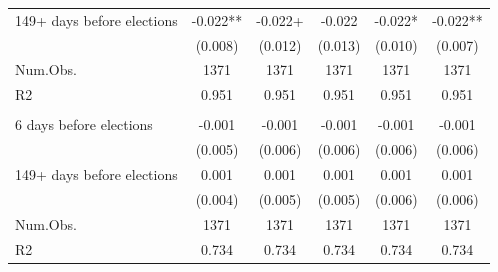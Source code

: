 \begin{tabular}[t]{lccccc}
\hspace{1em}149+ days before elections & -0.022** & -0.022+ & -0.022 & -0.022* & -0.022**\\
\hspace{1em} & (0.008) & (0.012) & (0.013) & (0.010) & (0.007)\\
\hspace{1em}Num.Obs. & 1371 & 1371 & 1371 & 1371 & \vphantom{1} 1371\\
\hspace{1em}R2 & 0.951 & 0.951 & 0.951 & 0.951 & 0.951\\
\addlinespace[0.5cm]
\multicolumn{6}{l}{Panel D: Turnout}\\
\hspace{1em}6 days before elections & -0.001 & -0.001 & -0.001 & -0.001 & -0.001\\
\hspace{1em} & (0.005) & (0.006) & (0.006) & (0.006) & (0.006)\\
\hspace{1em}149+ days before elections & 0.001 & 0.001 & 0.001 & 0.001 & 0.001\\
\hspace{1em} & (0.004) & (0.005) & (0.005) & (0.006) & (0.006)\\
\hspace{1em}Num.Obs. & 1371 & 1371 & 1371 & 1371 & 1371\\
\hspace{1em}R2 & 0.734 & 0.734 & 0.734 & 0.734 & 0.734\\
\bottomrule
\end{tabular}
